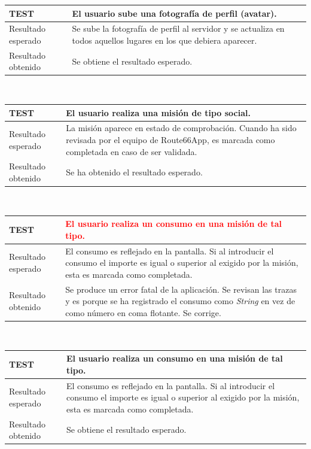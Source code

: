 \documentclass[twoside]{report}
\newcommand\addrow[2]{#1 &#2\\ }
\newcommand\addheading[2]{#1 &#2\\ \hline}
\newcommand\tabularhead{\begin{tabular}{lp{0.7\textwidth}}
\hline
}
\newenvironment{test}{\tabularhead}
{\hline\end{tabular}}
\begin{document}
\begin{test}
  \addheading{\textbf{TEST\arabic{test}}}{El usuario sube una fotografía de perfil (avatar).} 
  \addrow{Resultado esperado}{Se sube la fotografía de perfil al servidor y se actualiza en todos aquellos lugares en los que debiera aparecer.}
  \addrow{Resultado obtenido}{Se obtiene el resultado esperado.}
\end{test}\\

\vspace{0.5cm}

\begin{test}
  \addheading{\textbf{TEST\arabic{test}}}{El usuario realiza una misión de tipo social.} 
  \addrow{Resultado esperado}{La misión aparece en estado de comprobación. Cuando ha sido revisada por el equipo de Route66App, es marcada como completada en caso de ser validada.}
  \addrow{Resultado obtenido}{Se ha obtenido el resultado esperado.}
\end{test}\\

\vspace{0.5cm}

\begin{test}
  \addheading{\textbf{TEST\arabic{test}}}{\textcolor{red}{El usuario realiza un consumo en una misión de tal tipo.}} 
  \addrow{Resultado esperado}{El consumo es reflejado en la pantalla. Si al introducir el consumo el importe es igual o superior al exigido por la misión, esta es marcada como completada.}
  \addrow{Resultado obtenido}{Se produce un error fatal de la aplicación. Se revisan las trazas y es porque se ha registrado el consumo como \textit{String} en vez de como número en coma flotante. Se corrige.}
\end{test}\\

\vspace{0.5cm}

\begin{test}
  \addheading{\textbf{TEST\arabic{test}}}{El usuario realiza un consumo en una misión de tal tipo.} 
  \addrow{Resultado esperado}{El consumo es reflejado en la pantalla. Si al introducir el consumo el importe es igual o superior al exigido por la misión, esta es marcada como completada.}
  \addrow{Resultado obtenido}{Se obtiene el resultado esperado.}
\end{test}\\
\end{document}
